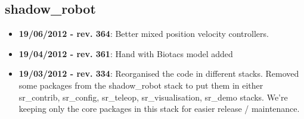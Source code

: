 
\subsection{shadow\_robot}
\label{sec:shadow_robot_changelog}

\begin{itemize}
\item \textbf{19/06/2012 - rev. 364}: Better mixed position velocity controllers.
\item \textbf{19/04/2012 - rev. 361}: Hand with Biotacs model added
\item \textbf{19/03/2012 - rev. 334}: Reorganised the code in different stacks. Removed some packages from the shadow\_robot stack to put them in either sr\_contrib, sr\_config, sr\_teleop, sr\_visualisation, sr\_demo stacks. We're keeping only the core packages in this stack for easier release / maintenance.
\end{itemize}